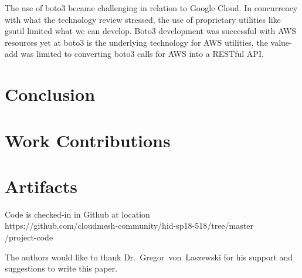 The use of boto3 became challenging in relation to Google Cloud. In concurrency
with what the technology review stressed, the use of proprietary utilities like
gsutil limited what we can develop. Boto3 development was successful with AWS
resources yet at boto3 is the underlying technology for AWS utilities, the
value-add was limited to converting boto3 calls for AWS into a RESTful API.

\section{Conclusion}

\section{Work Contributions}

\section{Artifacts}

Code is checked-in in Github at location \\
https://github.com/cloudmesh-community/hid-sp18-518/tree/master\\
/project-code \\

\begin{acks}

  The authors would like to thank Dr.~Gregor~von~Laszewski for his
  support and suggestions to write this paper.

\end{acks}


 

